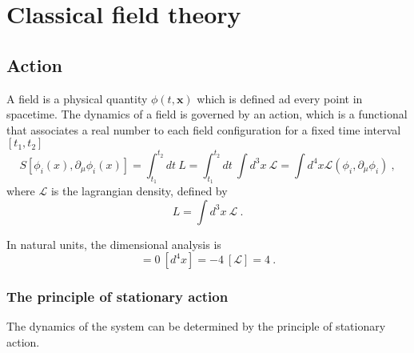 \part{Classical field theory}

\chapter{Action}

    A field is a physical quantity $\phi(t, \mathbf x)$ which is defined ad every point in spacetime. The dynamics of a field is governed by an action, which is a functional that associates a real number to each field configuration for a fixed time interval $[t_1, t_2]$
    \begin{equation}\label{action}
        S[\phi_i(x), \partial_\mu \phi_i(x)] = \int_{t_1}^{t_2} dt ~ L = \int_{t_1}^{t_2} dt ~ \int d^3x ~ \mathcal L = \int d^4 x \mathcal L (\phi_i, \partial_\mu \phi_i) ~,
    \end{equation}
    where $\mathcal L$ is the lagrangian density, defined by 
    \begin{equation*}
        L = \int d^3x ~ \mathcal L ~.
    \end{equation*}

    In natural units, the dimensional analysis is 
    \begin{equation*}
        [S] = 0 ~ [d^4 x]=-4 ~ [\mathcal L] = 4 ~.
    \end{equation*}

\section{The principle of stationary action}

    The dynamics of the system can be determined by the principle of stationary action. 


